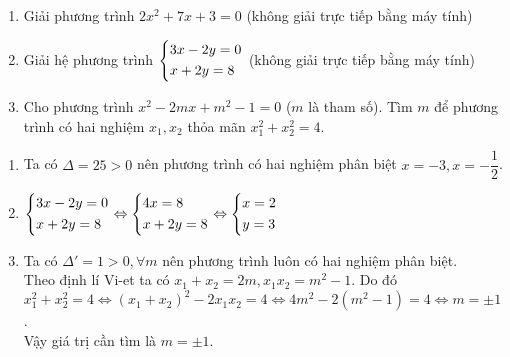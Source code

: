 \begin{ex}%
\hfill
    \begin{enumerate}
      \item Giải phương trình $2x^2+7x+3=0$ (không giải trực tiếp bằng máy tính)
      \item Giải hệ phương trình $\left\{\begin{aligned}&3x-2y=0\\&x+2y=8\end{aligned}\right.$ (không giải trực tiếp bằng máy tính)
      \item Cho phương trình $x^2-2mx+m^2-1=0$ ($m$ là tham số). Tìm $m$ để phương trình có hai nghiệm $x_1, x_2$ thỏa mãn $x_1^2+x_2^2=4$.
    \end{enumerate}
\loigiai
    {
    \begin{enumerate}
        \item Ta có $\Delta=25>0$ nên phương trình có hai  nghiệm phân biệt $x=-3, x=-\dfrac{1}{2}$.
        \item $\left\{\begin{aligned}&3x-2y=0\\&x+2y=8\end{aligned}\right. \Leftrightarrow \left\{\begin{aligned}&4x=8\\&x+2y=8\end{aligned}\right. \Leftrightarrow \left\{\begin{aligned}&x=2\\&y=3\end{aligned}\right.$
        \item Ta có $\Delta'=1>0, \forall m$ nên phương trình luôn có hai nghiệm phân biệt.\\
        Theo định lí Vi-et ta có $x_1+x_2=2m, x_1x_2=m^2-1$. Do đó\\
        $x_1^2+x_2^2=4 \Leftrightarrow \left(x_1+x_2\right)^2-2x_1x_2=4 \Leftrightarrow 4m^2-2(m^2-1)=4 \Leftrightarrow m=\pm 1$.\\
        Vậy giá trị cần tìm là $m=\pm 1$.
    \end{enumerate}
    }
\end{ex}

